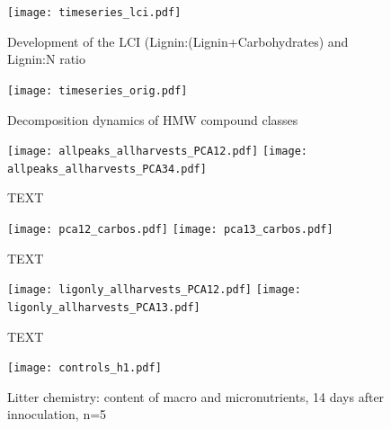 \documentclass[journal abbreviation]{copernicus}
\begin{document}
\begin{figure}[t]
\vspace*{2mm}
\begin{center}
\texttt{[image: timeseries\_lci.pdf]}
\end{center}
\label{lci}
\caption{Development of the LCI (Lignin:(Lignin+Carbohydrates) and Lignin:N ratio}
\end{figure}

\begin{figure}[t]
\vspace*{2mm}
  \begin{center}
\texttt{[image: timeseries\_orig.pdf]}

\end{center}
\label{timeseries}
\caption{Decomposition dynamics of HMW compound classes}
\end{figure}


\begin{figure}[t]
\vspace*{2mm}
\begin{center}
\texttt{[image: allpeaks\_allharvests\_PCA12.pdf]}
\texttt{[image: allpeaks\_allharvests\_PCA34.pdf]}

\end{center}
\caption{TEXT}
\end{figure}


\begin{figure}[t]
\vspace*{2mm}
\begin{center}
\texttt{[image: pca12\_carbos.pdf]}
\texttt{[image: pca13\_carbos.pdf]}

\end{center}
\caption{TEXT}
\end{figure}


\begin{figure}[t]
\vspace*{2mm}
\begin{center}
\texttt{[image: ligonly\_allharvests\_PCA12.pdf]}
\texttt{[image: ligonly\_allharvests\_PCA13.pdf]}

\end{center}
\caption{TEXT}
\end{figure}


\begin{figure}[t]
\vspace*{2mm}
\begin{center}
\texttt{[image: controls\_h1.pdf]}
\end{center}
\label{litchem_h1}
\caption{Litter chemistry: content of macro and micronutrients, 14 days after innoculation, n=5}
\end{figure}
\end{document}
